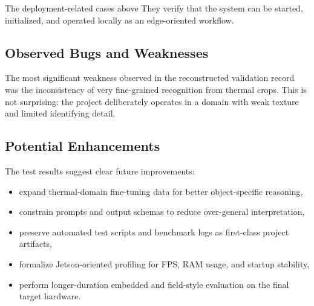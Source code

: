 The deployment-related cases above They verify that the
system can be started, initialized, and operated locally as an edge-oriented workflow.

\subsection{Observed Bugs and Weaknesses}

The most significant weakness observed in the reconstructed validation record was the
inconsistency of very fine-grained recognition from thermal crops. This is not surprising: the
project deliberately operates in a domain with weak texture and limited identifying detail.

\subsection{Potential Enhancements}

The test results suggest clear future improvements:

\begin{itemize}[nosep]
  \item expand thermal-domain fine-tuning data for better object-specific reasoning,
  \item constrain prompts and output schemas to reduce over-general interpretation,
  \item preserve automated test scripts and benchmark logs as first-class project artifacts,
  \item formalize Jetson-oriented profiling for FPS, RAM usage, and startup stability,
  \item perform longer-duration embedded and field-style evaluation on the final target
    hardware.
\end{itemize}
